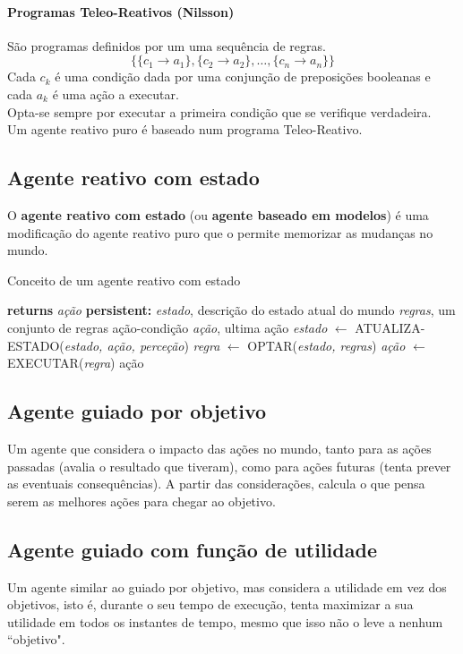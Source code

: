 \documentclass[]{report}
\begin{document}
\paragraph{Programas Teleo-Reativos (Nilsson)}
São programas definidos por um uma sequência de regras.
$$\{\{c_1 \rightarrow a_1\}, \{c_2 \rightarrow a_2\}, \dots, \{c_n \rightarrow a_n\}\}$$
Cada $c_k$ é uma condição dada por uma conjunção de preposições booleanas e cada $a_k$ é uma ação a executar.\\
Opta-se sempre por executar a primeira condição que se verifique verdadeira.\\[2mm]
Um agente reativo puro é baseado num programa Teleo-Reativo.
\subsection{Agente reativo com estado}
O \textbf{agente reativo com estado} (ou \textbf{agente baseado em modelos}) é uma modificação do agente reativo puro que o permite memorizar as mudanças no mundo.
\begin{algorithm}
	\caption{Conceito de um agente reativo com estado}
	\begin{algorithmic}
		 \textbf{returns} \textit{ação}
		\State \textbf{persistent:} \textit{estado}, descrição do estado atual do mundo
		\State \hspace{12mm} \textit{regras}, um conjunto de regras ação-condição
		\State \hspace{12mm} \textit{ação}, ultima ação
		\State \textit{estado} $\gets$ ATUALIZA-ESTADO(\textit{estado, ação, perceção})
		\State \textit{regra} $\gets$ OPTAR(\textit{estado, regras})
		\State \textit{ação} $\gets$ EXECUTAR(\textit{regra})
		\State \Return ação
		\EndFunction
	\end{algorithmic}
\end{algorithm}
\subsection{Agente guiado por objetivo}
Um agente que considera o impacto das ações no mundo, tanto para as ações passadas (avalia o resultado que tiveram), como para ações futuras (tenta prever as eventuais consequências).
A partir das considerações, calcula o que pensa serem as melhores ações para chegar ao objetivo.
\subsection{Agente guiado com função de utilidade}
Um agente similar ao guiado por objetivo, mas considera a utilidade em vez dos objetivos, isto é, durante o seu tempo de execução, tenta maximizar a sua utilidade em todos os instantes de tempo, mesmo que isso não o leve a nenhum ``objetivo".
\end{document}
